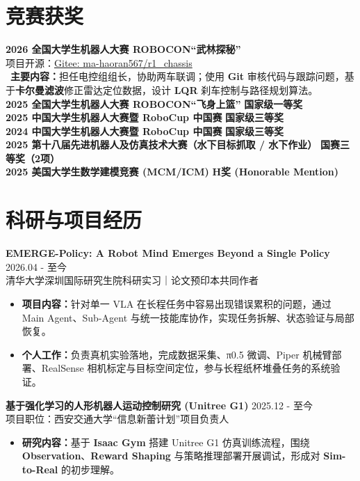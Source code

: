 \documentclass[11pt,a4paper]{article}
\begin{document}
\section{竞赛获奖}
\textbf{2026 全国大学生机器人大赛 ROBOCON“武林探秘”}\\
{\small 项目开源：\href{https://gitee.com/ma-haoran567/r1_chassis}{Gitee: ma-haoran567/r1\_chassis}}\\
{\small \textbullet\ \textbf{主要内容：}担任电控组组长，协助两车联调；使用 \textbf{Git} 审核代码与跟踪问题，基于\textbf{卡尔曼滤波}修正雷达定位数据，设计 \textbf{LQR} 刹车控制与路径规划算法。}\\
\textbf{2025 全国大学生机器人大赛 ROBOCON“飞身上篮”} \hfill \textbf{国家级一等奖}\\
\textbf{2025 中国大学生机器人大赛暨 RoboCup 中国赛} \hfill \textbf{国家级三等奖}\\
\textbf{2024 中国大学生机器人大赛暨 RoboCup 中国赛} \hfill \textbf{国家级三等奖}\\
\textbf{2025 第十八届先进机器人及仿真技术大赛（水下目标抓取 / 水下作业）} \hfill \textbf{国赛三等奖（2项）}\\
\textbf{2025 美国大学生数学建模竞赛 (MCM/ICM)} \hfill \textbf{H奖 (Honorable Mention)}

\section{科研与项目经历}
\textbf{EMERGE-Policy: A Robot Mind Emerges Beyond a Single Policy} \hfill 2026.04 - 至今 \\
{\small 清华大学深圳国际研究生院科研实习｜论文预印本共同作者}
\begin{itemize}[leftmargin=1.5em, noitemsep, topsep=2pt]
    \item \textbf{项目内容：}针对单一 VLA 在长程任务中容易出现错误累积的问题，通过 Main Agent、Sub-Agent 与统一技能库协作，实现任务拆解、状态验证与局部恢复。
    \item \textbf{个人工作：}负责真机实验落地，完成数据采集、π0.5 微调、Piper 机械臂部署、RealSense 相机标定与目标空间定位，参与长程纸杯堆叠任务的系统验证。
\end{itemize}

\textbf{基于强化学习的人形机器人运动控制研究 (Unitree G1)} \hfill 2025.12 - 至今 \\
{\small 项目职位：西安交通大学“信息新蕾计划”项目负责人}
\begin{itemize}[leftmargin=1.5em, noitemsep, topsep=2pt]
    \item \textbf{研究内容：}基于 \textbf{Isaac Gym} 搭建 Unitree G1 仿真训练流程，围绕 \textbf{Observation}、\textbf{Reward Shaping} 与策略推理部署开展调试，形成对 \textbf{Sim-to-Real} 的初步理解。
\end{itemize}
\end{document}
